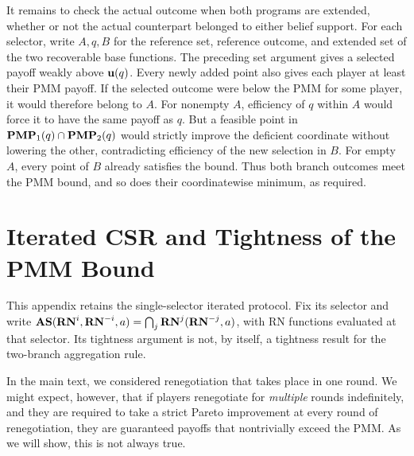 \documentclass[sigconf]{aamas}
\theoremstyle{definition}
\begin{document}
It remains to check the actual outcome when both programs are extended,
whether or not the actual counterpart belonged to either belief support.
For each selector, write $A,q,B$ for the reference set, reference outcome,
and extended set of the two recoverable base functions. The preceding
set argument gives a selected payoff weakly above $\textbf{u}(q)$.
Every newly added point also gives each player at least their PMM payoff.
If the selected outcome were below the PMM for some player, it would
therefore belong to $A$. For nonempty $A$, efficiency of $q$ within $A$
would force it to have the same payoff as $q$. But a feasible point
in $\mathbf{PMP}_1(q)\cap\mathbf{PMP}_2(q)$ would strictly improve the deficient
coordinate without lowering the other, contradicting efficiency of the
new selection in $B$. For empty $A$, every point of $B$ already
satisfies the bound. Thus both branch outcomes meet the PMM bound, and
so does their coordinatewise minimum, as required.

\section{Iterated CSR and Tightness of the PMM Bound}
\label{app:proof:ineff}

This appendix retains the single-selector iterated protocol. Fix its
selector and write
$\textbf{AS}(\mathbf{RN}^{i},\mathbf{RN}^{-i},a)=\bigcap_j\mathbf{RN}^{j}(\mathbf{RN}^{-j},a)$,
with RN functions evaluated at that selector. Its tightness argument
is not, by itself, a tightness result for the two-branch aggregation rule.

In the main
text,
we considered renegotiation that takes place in one round.
We might expect, however, that
if 
players
renegotiate
for \textit{multiple}
rounds
indefinitely,
and they are required
to take a strict Pareto
improvement
at every round of renegotiation,
they are guaranteed
payoffs that nontrivially
exceed
the PMM.
As we will
show,
this is not always true.
\end{document}
